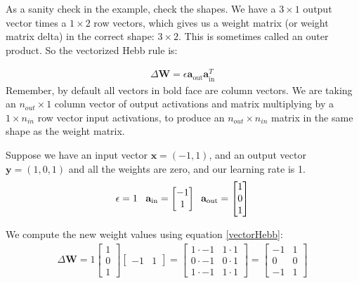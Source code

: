 As a sanity check in the example, check the shapes. We have a $3 \times 1$ output vector times a $1 \times 2$ row vectors, which gives us a weight matrix (or weight matrix delta) in the correct shape: $3 \times 2$. This is sometimes called an outer product. So the vectorized Hebb rule is: 

\begin{eqnarray}
\label{vectorHebb}
\Delta \mathbf{W}  = \epsilon \mathbf{a}_{\text{out}} \mathbf{a}_{\text{in}} ^T
\end{eqnarray}
Remember, by default all vectors in bold face are column vectors. We are taking an $n_{out} \times 1$ column vector of output activations and matrix multiplying by a $1 \times n_{in}$ row vector input activations, to produce an $n_{out} \times n_{in}$ matrix in the same shape as the weight matrix.

Suppose we have an input vector $\mathbf{x} = (-1, 1)$, and an output vector $\mathbf{y} = (1,0,1)$ and all the weights are zero, and our learning rate is 1.
\begin{equation*}
\epsilon = 1 \; \; \; \; \\
\mathbf{a}_{\text{in}} = \begin{bmatrix} -1 \\ 1 \end{bmatrix} \\ 
\; \; \mathbf{a}_{\text{out}} = \begin{bmatrix} 1 \\ 0 \\ 1 \end{bmatrix}
\end{equation*}

We compute the new weight values using equation \eqref{vectorHebb}:
\begin{align*}
\Delta \mathbf{W}  = 1
\begin{bmatrix} 1 \\ 0 \\ 1 \end{bmatrix} 
\begin{bmatrix} -1 & 1 \end{bmatrix} 
= \begin{bmatrix} 1 \cdot -1 & 1 \cdot 1 \\ 0 \cdot -1 & 0 \cdot 1 \\ 1 \cdot -1 & 1 \cdot 1 \end{bmatrix} 
= \begin{bmatrix} -1 & 1 \\ 0 & 0 \\  -1 & 1  \end{bmatrix}
\end{align*}


